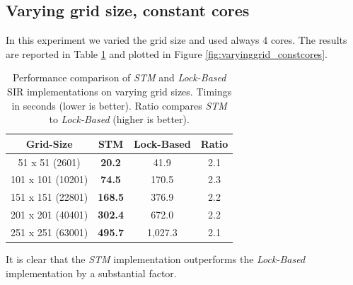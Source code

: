 \subsection{Varying grid size, constant cores}
In this experiment we varied the grid size and used always 4 cores. The results are reported in Table \ref{tab:varyinggrid_constcores} and plotted in Figure \ref{fig:varyinggrid_constcores}.

\begin{table}
	\centering
  	\begin{tabular}{ c || c | c | c }
        Grid-Size          & STM              & Lock-Based   & Ratio \\ \hline \hline 
   		51 x 51 (2601)    & \textbf{20.2}    & 41.9         & 2.1 \\ \hline
   		101 x 101 (10201) & \textbf{74.5}    & 170.5        & 2.3 \\ \hline
   		151 x 151 (22801) & \textbf{168.5}   & 376.9        & 2.2 \\ \hline
   		201 x 201 (40401) & \textbf{302.4}   & 672.0        & 2.2 \\ \hline
   		251 x 251 (63001) & \textbf{495.7}   & 1,027.3      & 2.1 \\ \hline \hline
  	\end{tabular}

  	\caption[Performance comparison of \textit{STM} and \textit{Lock-Based} SIR implementations on varying grid sizes]{Performance comparison of \textit{STM} and \textit{Lock-Based} SIR implementations on varying grid sizes. Timings in seconds (lower is better). Ratio compares \textit{STM} to \textit{Lock-Based} (higher is better).}
	\label{tab:varyinggrid_constcores}
\end{table}

It is clear that the \textit{STM} implementation outperforms the \textit{Lock-Based} implementation by a substantial factor.

